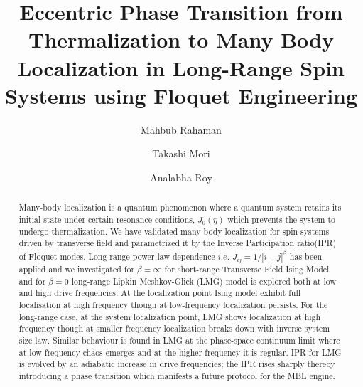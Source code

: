 \documentclass[%
reprint,
superscriptaddress,
amsmath,amssymb,
aps,
prb,
]{revtex4-2}
\begin{document}
	
	
	\title{Eccentric Phase Transition from Thermalization to Many Body Localization  in Long-Range Spin Systems using Floquet Engineering}%
	
	\author{Mahbub Rahaman}
	\author{Takashi Mori}
	\author{Analabha Roy}
	
	\begin{abstract}
		Many-body localization is a  quantum phenomenon where a quantum system retains its initial state under certain resonance conditions, $J_0(\eta)$ which prevents the system to undergo thermalization. We have validated many-body localization for spin systems driven by transverse field and parametrized it by the Inverse Participation ratio(IPR) of Floquet modes. Long-range power-law dependence $i.e.$ $J_{ij} = 1/|i-j|^{\beta}$ has been applied and we investigated for $\beta = \infty$ for short-range Transverse Field Ising Model and for  $\beta = 0$  long-range Lipkin Meshkov-Glick (LMG) model is explored both at low and high drive frequencies. At the localization point Ising model exhibit full localisation at  high frequency though at low-frequency localization persists. For the long-range case, at the system localization point, LMG shows localization at high frequency though at smaller frequency localization breaks down with inverse system size law. Similar behaviour is found in LMG at the phase-space continuum limit where at low-frequency chaos emerges and at the higher frequency it is regular. IPR for LMG is evolved by an adiabatic increase in drive frequencies; the IPR rises sharply  thereby introducing a phase transition which manifests a future protocol for the MBL engine.
		
	\end{abstract}
	
\end{document}
